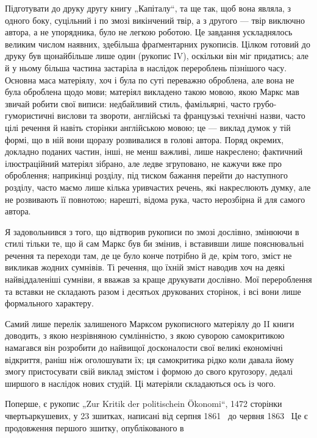 
Підготувати до друку другу книгу „Капіталу“, та ще так, щоб вона
являла, з одного боку, суцільний і по змозі викінчений твір, а з другого
— твір виключно автора, а не упорядника, було не легкою роботою.
Це завдання ускладнялось великим числом наявних, здебільша фраґментарних
рукописів. Цілком готовий до друку був щонайбільше лише один
(рукопис IV), оскільки він міг придатись; але й у ньому більша частина
застаріла в наслідок перероблень пізнішого часу. Основна маса матеріялу,
хоч і була по суті переважно оброблена, але вона не була оброблена щодо
мови; матеріял викладено такою мовою, якою Маркс мав звичай робити свої
виписи: недбайливий стиль, фамільярні, часто грубо-гумористичні вислови
та звороти, англійські та французькі технічні назви, часто цілі речення
й навіть сторінки англійською мовою; це — виклад думок у тій формі,
що в ній вони щоразу розвивалися в голові автора. Поряд окремих,
докладно поданих частин, інші, не менш важливі, лише накреслено; фактичний
ілюстраційний матеріял зібрано, але ледве згруповано, не кажучи
вже про оброблення; наприкінці розділу, під тиском бажання перейти до
наступного розділу, часто маємо лише кілька уривчастих речень, які накреслюють
думку, але не розвивають її повнотою; нарешті, відома рука,
часто нерозбірна й для самого автора.

Я задовольнився з того, що відтворив рукописи по змозі дослівно,
змінюючи в стилі тільки те, що й сам Маркс був би змінив, і вставивши
лише пояснювальні речення та переходи там, де це було конче потрібно
й де, крім того, зміст не викликав жодних сумнівів. Ті речення, що їхній
зміст наводив хоч на деякі найвіддаленіші сумніви, я вважав за краще
друкувати дослівно. Мої перероблення та вставки не складають разом і
десятьох друкованих сторінок, і всі вони лише формального характеру.

Самий лише перелік залишеного Марксом рукописного матеріялу до
II книги доводить, з якою незрівняною сумлінністю, з якою суворою
самокритикою намагався він розробити до найвищої досконалости свої
великі економічні відкриття, раніш ніж оголошувати їх; ця самокритика
рідко коли давала йому змогу пристосувати свій виклад змістом і формою
до свого кругозору, дедалі ширшого в наслідок нових студій. Ці
матеріяли складаються ось із чого.

Поперше, є рукопис „Zur Kritik der politischein Ökonomi“, 1472 сторінки
чвертьаркушевих, у 23 зшитках, написані від серпня 1861~ до
червня 1863~ Це є продовження першого зшитку, опублікованого в
\parbreak{}  %
